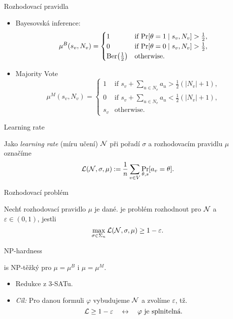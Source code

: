 \documentclass [14pt,xcolor=dvipsnames]{beamer}
\def\problemClass{\textsf}
\def\np{\problemClass{NP}}
\begin{document}
\begin{frame}{Rozhodovací pravidla}
    \begin{itemize}
        \item<1-> Bayesovská inference: \[
    \mu^B(s_v, N_v) = \begin{cases}
        1 & \text{if $\pr{\theta = 1 \suchthat s_v, N_v} > \frac 12$}, \\
        0 & \text{if $\pr{\theta = 0 \suchthat s_v, N_v} > \frac 12$}, \\
        \berd{\frac 12} & \text{otherwise.}
    \end{cases}
        \]
        \item<2-> Majority Vote \[
    \mu^M(s_v, N_v) = \begin{cases}
        1 & \text{if $s_v + \sum_{u \in N_v} a_u > \frac 12 (|N_v| + 1)$}, \\
        0 & \text{if $s_v + \sum_{u \in N_v} a_u < \frac 12 (|N_v| + 1)$}, \\
				s_v & \text{otherwise.}
    \end{cases}
        \]
    \end{itemize}
\end{frame}

\begin{frame}{Learning rate}
\begin{defi}
    Jako \emph{learning rate} (míru učení) $ \network $ při pořadí $ \sigma $ a rozhodovacím pravidlu $\mu$ označíme \[
		\clr \network \sigma \mu \deq  \frac 1n\sum_{v \in V} \Pr_{\theta, s}[a_v = \theta].
	\]
\end{defi}
\end{frame}

\begin{frame}{Rozhodovací problém}
\begin{defi}[{\netlearn{}}]
        Nechť \alert<2>{rozhodovací pravidlo $\mu$} je dané.
        \netlearn{} je problém rozhodnout pro \alert<3>{$ \network $} a \alert<3>{$ \varepsilon \in (0,1)$}, jestli \[
            \max_{\sigma \in \Sigma_n} \lr \network \sigma \mu \geq 1-\varepsilon.
        \]
\end{defi}
\end{frame}

\begin{frame}{\np{}-hardness}
    \begin{thm}
        \netlearn{} is \np{}-těžký pro $ \mu = \mu^B $ i $ \mu = \mu^M $.
    \end{thm}
    \begin{itemize}
        \item<2-> Redukce z 3-SATu.
        \item<3-> \emph{Cíl:} Pro danou formuli $\varphi$ vybudujeme $\network$ a zvolíme $\varepsilon$, tž. \[
           \mathcal{L} \geq 1-\varepsilon \quad\iff\quad \text{$ \varphi $ je splnitelná.}
        \] 
    \end{itemize}
\end{frame}
\end{document}
